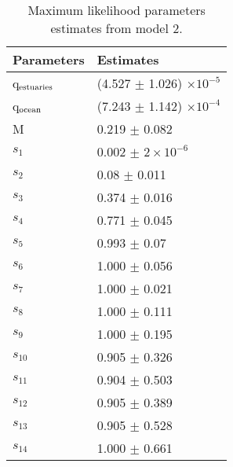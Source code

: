 \documentclass[12pt]{article}
\begin{document}
\begin{table}[ht]
\centering
\begin{tabular}{ll}
  \hline
Parameters & Estimates \\ 
  \hline
q$_{\rm{estuaries}}$ & (4.527 $\pm$ 1.026) $\times 10^{-5}$\\ 
  q$_{\rm{ocean}}$ & (7.243 $\pm$ 1.142) $\times 10^{-4}$\\ 
  M & 0.219 $\pm$ 0.082 \\ 
  $s_{1}$ & 0.002 $\pm$ $2 \times 10^{-6}$ \\ 
  $s_{2}$ & 0.08 $\pm$ 0.011 \\ 
  $s_{3}$ & 0.374 $\pm$ 0.016 \\ 
  $s_{4}$ & 0.771 $\pm$ 0.045 \\ 
  $s_{5}$ & 0.993 $\pm$ 0.07 \\ 
  $s_{6}$ & 1.000 $\pm$ 0.056 \\ 
  $s_{7}$ & 1.000 $\pm$ 0.021 \\ 
  $s_{8}$ & 1.000 $\pm$ 0.111 \\ 
  $s_{9}$ & 1.000 $\pm$ 0.195 \\ 
  $s_{10}$ & 0.905 $\pm$ 0.326 \\ 
  $s_{11}$ & 0.904 $\pm$ 0.503 \\ 
  $s_{12}$ & 0.905 $\pm$ 0.389 \\ 
  $s_{13}$ & 0.905 $\pm$ 0.528 \\ 
  $s_{14}$ & 1.000 $\pm$ 0.661 \\ 
   \hline
\end{tabular}
\caption{Maximum likelihood parameters estimates from model 2.}
\label{tab:BestParameterEstimates}
\end{table}

\end{document}

